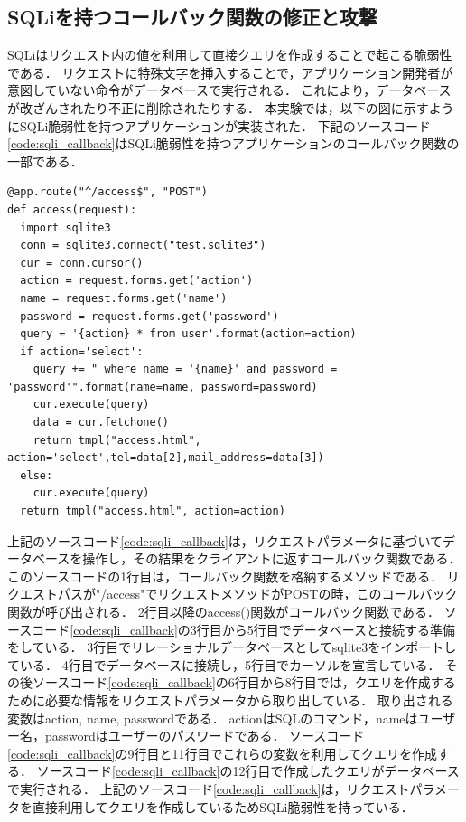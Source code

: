 \documentclass[a4paper,12pt]{jreport}
\begin{document}
\subsection{SQLiを持つコールバック関数の修正と攻撃}
SQLiはリクエスト内の値を利用して直接クエリを作成することで起こる脆弱性である．
リクエストに特殊文字を挿入することで，アプリケーション開発者が意図していない命令がデータベースで実行される．
これにより，データベースが改ざんされたり不正に削除されたりする．
本実験では，以下の図に示すようにSQLi脆弱性を持つアプリケーションが実装された．
下記のソースコード\ref{code:sqli_callback}はSQLi脆弱性を持つアプリケーションのコールバック関数の一部である．
\begin{lstlisting}[caption={SQLi脆弱性を持つコールバック関数}, label=code:sqli_callback, captionpos=b]
@app.route("^/access$", "POST")
def access(request):
  import sqlite3
  conn = sqlite3.connect("test.sqlite3")
  cur = conn.cursor()
  action = request.forms.get('action')
  name = request.forms.get('name')
  password = request.forms.get('password')
  query = '{action} * from user'.format(action=action)
  if action='select':
    query += " where name = '{name}' and password = 'password'".format(name=name, password=password)
    cur.execute(query)
    data = cur.fetchone()
    return tmpl("access.html", action='select',tel=data[2],mail_address=data[3])
  else:
    cur.execute(query)
  return tmpl("access.html", action=action)
\end{lstlisting}
上記のソースコード\ref{code:sqli_callback}は，リクエストパラメータに基づいてデータベースを操作し，その結果をクライアントに返すコールバック関数である．
このソースコードの1行目は，コールバック関数を格納するメソッドである．
リクエストパスが"/access"でリクエストメソッドがPOSTの時，このコールバック関数が呼び出される．
2行目以降のaccess()関数がコールバック関数である．
ソースコード\ref{code:sqli_callback}の3行目から5行目でデータベースと接続する準備をしている．
3行目でリレーショナルデータベースとしてsqlite3をインポートしている．
4行目でデータベースに接続し，5行目でカーソルを宣言している．
その後ソースコード\ref{code:sqli_callback}の6行目から8行目では，クエリを作成するために必要な情報をリクエストパラメータから取り出している．
取り出される変数はaction, name, passwordである．
actionはSQLのコマンド，nameはユーザー名，passwordはユーザーのパスワードである．
ソースコード\ref{code:sqli_callback}の9行目と11行目でこれらの変数を利用してクエリを作成する．
ソースコード\ref{code:sqli_callback}の12行目で作成したクエリがデータベースで実行される．
上記のソースコード\ref{code:sqli_callback}は，リクエストパラメータを直接利用してクエリを作成しているためSQLi脆弱性を持っている．
\end{document}
